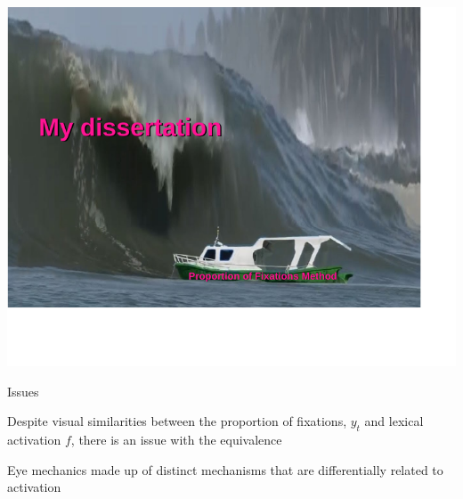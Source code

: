 \documentclass{beamer}
\newcommand{\vp}{\vspace{2mm}}
\begin{document}
%
\begin{frame}
\begin{center}
\centering
\includegraphics[scale=1]{boat_meme.pdf}
\end{center}
\end{frame}

%

%
%
%
%
%
%

\begin{frame}{Issues}\large



Despite visual similarities between the proportion of fixations, $y_t$ and lexical activation $f$, there is an issue with the equivalence \vspace{6mm}


Eye mechanics made up of distinct mechanisms that are differentially related to activation 


\end{frame}
\end{document}
